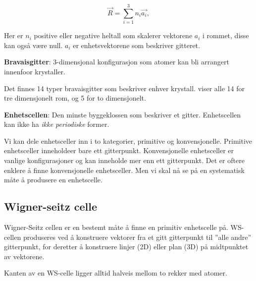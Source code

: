 \begin{equation}
\label{eq:real}
    \Vec{R} = \sum_{i=1}^3 n_i\Vec{a_i},
\end{equation}

Her er $n_i$ positive eller negative heltall som skalerer vektorene $a_i$ i rommet, disse kan også være null. $a_i$ er enhetsvektorene som beskriver gitteret.

\begin{definition}
    \textbf{Bravaisgitter}: 3-dimensjonal konfigurasjon som atomer kan bli arrangert innenfoor krystaller.
\end{definition}

Det finnes 14 typer bravaisgitter som beskriver enhver krystall.  viser alle 14 for tre dimensjonelt rom, og 5 for to dimensjonelt.

\begin{definition}
    \textbf{Enhetscellen}: Den minste byggeklossen som beskriver et gitter. Enhetscellen kan ikke ha \textit{ikke periodiske} former.
\end{definition}

Vi kan dele enhetsceller inn i to kategorier, primitive og konvensjonelle. Primitive enhetsceller inneholdeer bare ett gitterpunkt. Konvensjonelle enhetsceller er vanlige konfigurasjoner og kan inneholde mer enn ett gitterpunkt. Det er oftere enklere å finne konvensjonelle enhetsceller. Men vi skal nå se på en systematisk måte å produsere en enhetscelle.

\subsection{Wigner-seitz celle}
\label{sec:tema4_7}
Wigner-Seitz cellen er en bestemt måte å finne en primitiv enhetscelle på. WS-cellen produseres ved å konstruere vektorer fra et gitt gitterpunkt til ''alle andre'' gitterpunkt, for deretter å konstruere linjer (2D) eller plan (3D) på midtpunktet av vektorene.

Kanten av en WS-celle ligger alltid halveis mellom to rekker med atomer. 

